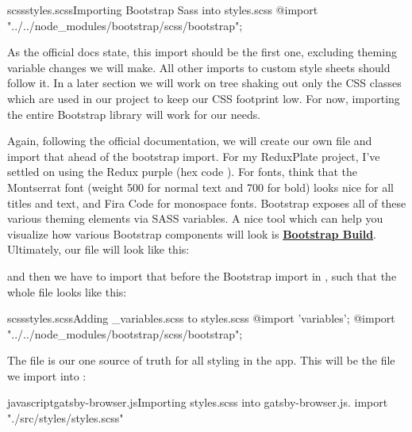 \documentclass[paper=6in:9in,pagesize=pdftex,headinclude=on,footinclude=on,12pt,twoside]{scrbook}
\newcommand{\link}[2]{\textbf{\textcolor{monokaiPink}{\href{#2}{#1}}}}
\begin{document}
\begin{codeInput}{scss}{styles.scss}{Importing Bootstrap Sass into styles.scss}
@import "../../node_modules/bootstrap/scss/bootstrap";
\end{codeInput}

As the official docs state, this import should be the first one, excluding theming variable changes we will make. All other imports to custom style sheets should follow it. In a later section we will work on tree shaking out only the CSS classes which are used in our project to keep our CSS footprint low. For now, importing the entire Bootstrap library will work for our needs.


Again, following the official documentation, we will create our own  file and import that ahead of the bootstrap import. For my ReduxPlate project, I've settled on using the Redux purple (hex code ). For fonts, think that the Montserrat font (weight 500 for normal text and 700 for bold) looks nice for all titles and text, and Fira Code for monospace fonts. Bootstrap exposes all of these various theming elements via SASS variables. A nice tool which can help you visualize how various Bootstrap components will look is \link{Bootstrap Build}{https://bootstrap.build/app}. Ultimately, our  file will look like this:


and then we have to import that before the Bootstrap import in , such that the whole file looks like this:

\begin{codeInput}{scss}{styles.scss}{Adding \_variables.scss to styles.scss}
@import 'variables';
@import "../../node_modules/bootstrap/scss/bootstrap";
\end{codeInput}


The  file is our one source of truth for all styling in the app. This will be the file we import into :

\begin{codeInput}{javascript}{gatsby-browser.js}{Importing styles.scss into gatsby-browser.js.}
import "./src/styles/styles.scss"
\end{codeInput}
\end{document}

